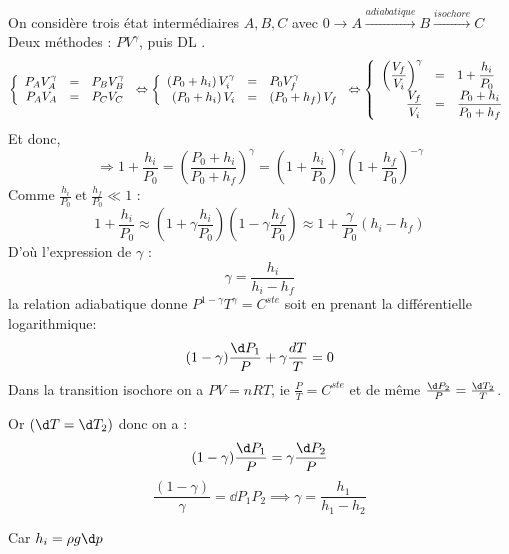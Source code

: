 \begin{Answer}
	On considère trois état intermédiaires $A,B,C$ avec $0 \to A \xrightarrow{adiabatique} B \xrightarrow{isochore} C $
	Deux méthodes :
	\Question  $PV^\gamma$, puis DL .
	\[\left\{
	\begin{array}{r c l}
		P_AV_A^\gamma&=&P_BV_B^\gamma\\
		P_AV_A&=&P_CV_C
	\end{array}
	\right.
	\Leftrightarrow
	\left\{
	\begin{array}{r c l}
		\left( P_0+h_i \right)V_i^\gamma&=&P_0V_f^\gamma\\
		\left( P_0+h_i \right)V_i&=&\left( P_0+h_f \right)V_f
	\end{array}
	\right.
	\Leftrightarrow
	\left\{
	\begin{array}{r c l}
		\left(\dfrac{V_f}{V_i}\right)^\gamma&=&1+\dfrac{h_i}{P_0}\\
		\dfrac{V_f}{V_i}&=&\dfrac{P_0+h_i}{P_0+h_f}
	\end{array}
	\right.\]
	Et donc,
	\[\Rightarrow 1+\frac{h_i}{P_0}=\left(\frac{P_0+h_i}{P_0+h_f}\right)^\gamma
	=\left(1+\dfrac{h_i}{P_0}\right)^\gamma\left(1+\frac{h_f}{P_0}\right)^{-\gamma}\]
	Comme $\frac{h_i}{P_0} \; \mathrm{et} \; \frac{h_f}{P_0} \ll 1$ :
	\[1+\frac{h_i}{P_0}\approx\left(1+\gamma\dfrac{h_i}{P_0}\right)\left(1-\gamma\dfrac{h_f}{P_0}\right)
	\approx 1+\dfrac{\gamma}{P_0}\left( h_i-h_f \right)\]
	D'où l'expression de $\gamma$ :
	\[\gamma=\frac{h_i}{h_i-h_f}\]
	\Question
	la relation adiabatique donne $P^{1-\gamma}T^\gamma = C^{ste}$ soit en prenant la différentielle logarithmique:
	\[(1-\gamma) \frac{\d P_1}{P} + \gamma \frac{dT}{T} = 0 \]
	Dans la transition isochore on a $PV=nRT $, ie $\frac{P}{T} = C^{ste}$ et de même $\frac{\d P_2 }{P}=\frac{\d T_2}{T}$.

	Or $(\d T = \d T_2)$ donc on a :
	\[(1-\gamma) \frac{\d P_1}{P} =\gamma \frac{\d P_2}{P}\]
	\[\frac{(1-\gamma)}{\gamma} = \dd{P_1}{P_2}  \implies \gamma = \frac{h_1}{h_1-h_2}\]

	Car $h_i = \rho g \d p$
\end{Answer}
